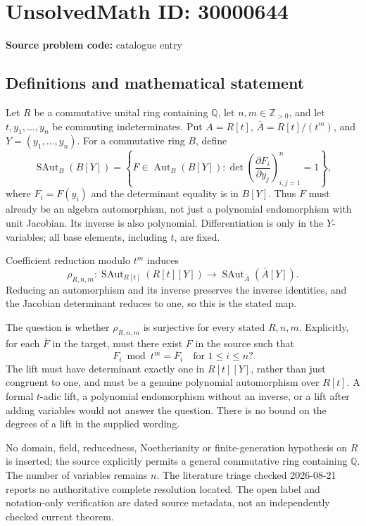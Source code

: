 \documentclass[11pt]{article}
\newcommand{\Z}{\mathbb{Z}}
\newcommand{\Q}{\mathbb{Q}}
\begin{document}
\section*{UnsolvedMath ID: 30000644}
\textbf{Source problem code:} catalogue entry
\subsection{Definitions and mathematical statement}
Let \(R\) be a commutative unital ring containing \(\Q\), let \(n,m\in\Z_{>0}\), and let \(t,y_1,\ldots,y_n\) be commuting indeterminates. Put \(A=R[t]\), \(\overline A=R[t]/(t^m)\), and \(Y=(y_1,\ldots,y_n)\). For a commutative ring \(B\), define
\[
 \operatorname{SAut}_{B}(B[Y])=
 \left\{F\in\operatorname{Aut}_{B}(B[Y]):
 \det\left(\frac{\partial F_i}{\partial y_j}\right)_{i,j=1}^n=1\right\},
\]
where \(F_i=F(y_i)\) and the determinant equality is in \(B[Y]\). Thus \(F\) must already be an algebra automorphism, not just a polynomial endomorphism with unit Jacobian. Its inverse is also polynomial. Differentiation is only in the \(Y\)-variables; all base elements, including \(t\), are fixed.

Coefficient reduction modulo \(t^m\) induces
\[
 \rho_{R,n,m}:\operatorname{SAut}_{R[t]}(R[t][Y])
 \longrightarrow
 \operatorname{SAut}_{\overline A}(\overline A[Y]).
\]
Reducing an automorphism and its inverse preserves the inverse identities, and the Jacobian determinant reduces to one, so this is the stated map.

The question is whether \(\rho_{R,n,m}\) is surjective for every stated \(R,n,m\). Explicitly, for each \(\overline F\) in the target, must there exist \(F\) in the source such that
\[
 F_i\bmod t^m=\overline F_i\quad\text{for }1\leq i\leq n?
\]
The lift must have determinant exactly one in \(R[t][Y]\), rather than just congruent to one, and must be a genuine polynomial automorphism over \(R[t]\). A formal \(t\)-adic lift, a polynomial endomorphism without an inverse, or a lift after adding variables would not answer the question. There is no bound on the degrees of a lift in the supplied wording.

No domain, field, reducedness, Noetherianity or finite-generation hypothesis on \(R\) is inserted; the source explicitly permits a general commutative ring containing \(\Q\). The number of variables remains \(n\). The literature triage checked 2026-08-21 reports no authoritative complete resolution located. The open label and notation-only verification are dated source metadata, not an independently checked current theorem.
\end{document}
